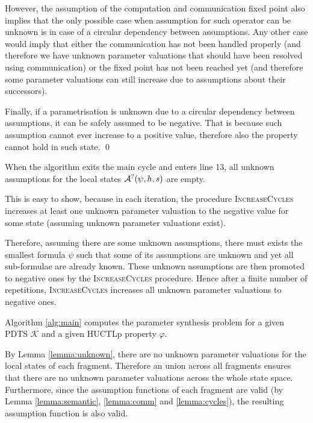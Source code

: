 
However, the assumption of the computation and communication fixed point also implies that the only possible case when assumption for such operator can be unknown is in case of a circular dependency between assumptions. Any other case would imply that either the communication has not been handled properly (and therefore we have unknown parameter valuations that should have been resolved using communication) or the fixed point has not been reached yet (and therefore some parameter valuations can still increase due to assumptions about their successors).

Finally, if a parametrisation is unknown due to a circular dependency between assumptions, it can be safely assumed to be negative. That is because such assumption cannot ever increase to a positive value, therefore also the property cannot hold in such state. \qed

\begin{lemma}
	\label{lemma:unknown}
	When the algorithm exits the main cycle and enters line 13, all unknown assumptions for the local states $\mathcal{A}^?(\psi, h, s)$ are empty.
\end{lemma}

This is easy to show, because in each iteration, the procedure \textsc{IncreaseCycles} increases at least one unknown parameter valuation to the negative value for some state (assuming unknown parameter valuations exist). 

Therefore, assuming there are some unknown assumptions, there must exists the smallest formula $\psi$ such that some of its assumptions are unknown and yet all sub-formulae are already known. These unknown assumptions are then promoted to negative ones by the \textsc{IncreaseCycles} procedure. Hence after a finite number of repetitions, \textsc{IncreaseCycles} increases all unknown parameter valuations to negative ones.

\begin{theorem}
	Algorithm \ref{alg:main} computes the parameter synthesis problem for a given \ac{PDTS} $\mathcal{K}$ and a given \ac{HUCTLp} property $\varphi$.
\end{theorem}

By Lemma \ref{lemma:unknown}, there are no unknown parameter valuations for the local states of each fragment. Therefore an union across all fragments ensures that there are no unknown parameter valuations across the whole state space. Furthermore, since the assumption functions of each fragment are valid (by Lemma 	\ref{lemma:semantic}, \ref{lemma:comm} and \ref{lemma:cycles}), the resulting assumption function is also valid.

